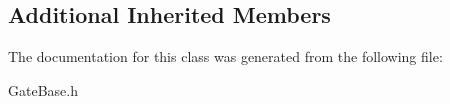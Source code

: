 \subsection*{Additional Inherited Members}


The documentation for this class was generated from the following file\+:\begin{DoxyCompactItemize}
\item 
Gate\+Base.\+h\end{DoxyCompactItemize}
